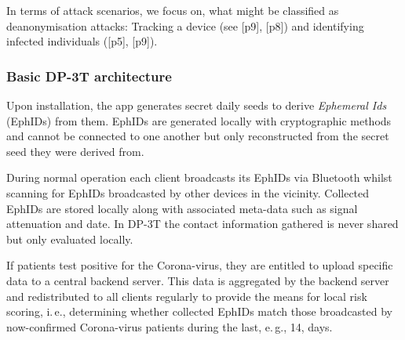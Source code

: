 \documentclass{llncs}
\begin{document}
In terms of attack scenarios, we focus on, what might be classified as deanonymisation attacks: Tracking a device (see \cite{dp3t:psre}[p9], \cite{pepppt:dp3tana}[p8]) and identifying infected individuals (\cite{dp3t:psre}[p5], \cite{pepppt:dp3tana}[p9]).

\subsubsection{Basic DP-3T architecture}
Upon installation, the app generates secret daily seeds to derive \textit{Ephemeral Ids}
(EphIDs) from them. EphIDs are generated locally with cryptographic methods and cannot be connected
to one another but only reconstructed from the secret seed they were derived from.

During normal operation each client broadcasts its EphIDs via Bluetooth whilst scanning for
EphIDs broadcasted by other devices in the vicinity. Collected EphIDs are stored locally along
with associated meta-data such as signal attenuation and date. In DP-3T the contact information
gathered is never shared but only evaluated locally.

If patients test positive for the Corona-virus, they are entitled to upload specific data to a
central backend server. This data is aggregated by the backend server and redistributed to all
clients regularly to provide the means for local risk scoring, i.\,e., determining whether collected
EphIDs match those broadcasted by now-confirmed Corona-virus patients during the last, e.\,g., 14, 
days.
\end{document}
